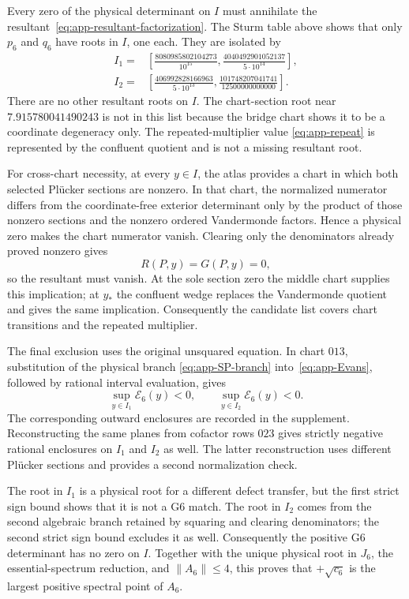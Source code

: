 Every zero of the physical determinant on \(I\) must annihilate the
resultant~\eqref{eq:app-resultant-factorization}.  The Sturm table above
shows that only \(p_6\) and \(q_6\) have roots in \(I\), one each.  They are
isolated by
\begin{align}
 I_1={}&\left[
 \frac{8080985802104273}{10^{15}},
 \frac{4040492901052137}{5\cdot10^{14}}
 \right],                                             \label{eq:app-I1}\\
 I_2={}&\left[
 \frac{406992828166963}{5\cdot10^{13}},
 \frac{101748207041741}{12500000000000}
 \right].                                             \label{eq:app-I2}
\end{align}
There are no other resultant roots on \(I\).  The chart-section root near
\(7.915780041490243\) is not in this list because the bridge chart shows it
to be a coordinate degeneracy only.  The repeated-multiplier value
\eqref{eq:app-repeat} is represented by the confluent quotient and is not a
missing resultant root.

For cross-chart necessity, at every
\(y\in I\), the atlas provides a chart in which both selected Pl\"ucker
sections are nonzero.  In that chart, the normalized numerator differs from
the coordinate-free exterior determinant only by the product of those
nonzero sections and the nonzero ordered Vandermonde factors.  Hence a
physical zero makes the chart numerator vanish.  Clearing only the
denominators already proved nonzero gives
\[
R(P,y)=G(P,y)=0,
\]
so the resultant must vanish.  At the sole section zero the middle chart
supplies this implication; at \(y_*\) the confluent wedge replaces the
Vandermonde quotient and gives the same implication. Consequently the
candidate list covers chart transitions and the repeated multiplier.

The final exclusion uses the original unsquared equation. In chart \(013\),
substitution of the physical branch
\eqref{eq:app-SP-branch} into~\eqref{eq:app-Evans}, followed by rational
interval evaluation, gives
\[
\sup_{y\in I_1}\mathcal E_6(y)<0,
\qquad
\sup_{y\in I_2}\mathcal E_6(y)<0.
\]
The corresponding outward enclosures are recorded in the supplement.
Reconstructing the same planes from
cofactor rows \(023\) gives strictly negative rational enclosures on
\(I_1\) and \(I_2\) as well. The latter reconstruction uses different
Pl\"ucker sections and provides a second normalization check.

The root in \(I_1\) is a physical root for a different defect transfer, but
the first strict sign bound shows that it is not a G6 match. The root in
\(I_2\) comes from the second algebraic branch retained by squaring and
clearing denominators; the second strict sign bound excludes it as well.
Consequently the positive G6 determinant has no zero on \(I\).  Together
with the unique physical root in \(J_6\), the essential-spectrum reduction,
and \(\|A_6\|\leq4\), this proves that \(+\sqrt{c_6}\) is the largest
positive spectral point of \(A_6\).

